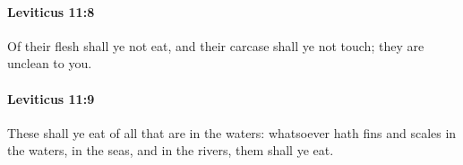 		\paragraph{Leviticus 11:8} %
			\label{LEVITICUS-11-8}

			Of their flesh shall ye not eat, and their carcase shall ye not touch; they are unclean to you.


		\paragraph{Leviticus 11:9} %
			\label{LEVITICUS-11-9}

			These shall ye eat of all that are in the waters: whatsoever hath fins and scales in the waters, in the seas, and in the rivers, them shall ye eat.


